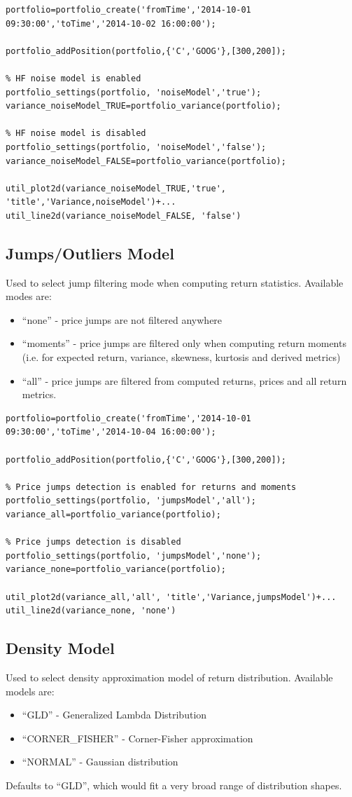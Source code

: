 \documentclass[letterpaper]{report}
\newcounter{N}
\begin{document}
\begin{lstlisting}
portfolio=portfolio_create('fromTime','2014-10-01 09:30:00','toTime','2014-10-02 16:00:00');

portfolio_addPosition(portfolio,{'C','GOOG'},[300,200]);

% HF noise model is enabled
portfolio_settings(portfolio, 'noiseModel','true');
variance_noiseModel_TRUE=portfolio_variance(portfolio);

% HF noise model is disabled
portfolio_settings(portfolio, 'noiseModel','false');
variance_noiseModel_FALSE=portfolio_variance(portfolio);

util_plot2d(variance_noiseModel_TRUE,'true', 'title','Variance,noiseModel')+...
util_line2d(variance_noiseModel_FALSE, 'false')
\end{lstlisting}

\subsection{Jumps/Outliers Model}
Used to select jump filtering mode when computing return statistics. Available modes are: 
\begin{itemize} 
  \item ``none'' - price jumps are not filtered anywhere
  \item ``moments'' - price jumps are filtered only when computing return moments
  (i.e. for expected return, variance, skewness, kurtosis and derived
  metrics)
  \item ``all'' - price jumps are filtered from computed returns, prices and all
   return metrics.
\end{itemize}
\begin{lstlisting}
portfolio=portfolio_create('fromTime','2014-10-01 09:30:00','toTime','2014-10-04 16:00:00');

portfolio_addPosition(portfolio,{'C','GOOG'},[300,200]);

% Price jumps detection is enabled for returns and moments
portfolio_settings(portfolio, 'jumpsModel','all');
variance_all=portfolio_variance(portfolio);

% Price jumps detection is disabled
portfolio_settings(portfolio, 'jumpsModel','none');
variance_none=portfolio_variance(portfolio);

util_plot2d(variance_all,'all', 'title','Variance,jumpsModel')+...
util_line2d(variance_none, 'none')
\end{lstlisting}

\subsection {Density Model}
Used to select density approximation model of return distribution. Available models are:
\begin{itemize} 
  \item ``GLD'' - Generalized Lambda Distribution
  \item ``CORNER\_FISHER'' - Corner-Fisher approximation
  \item ``NORMAL'' - Gaussian distribution
\end{itemize}
Defaults to ``GLD'', which would fit a very broad range of distribution shapes.
\end{document}
